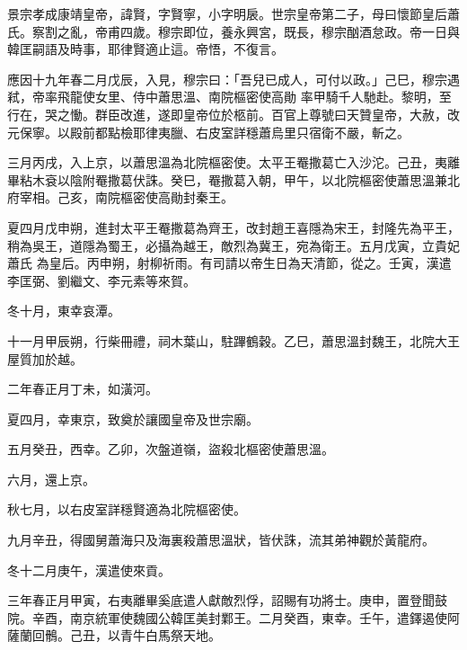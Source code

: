 
\begin{pinyinscope}

 景宗孝成康靖皇帝，諱賢，字賢寧，小字明扆。世宗皇帝第二子，母曰懷節皇后蕭氏。察割之亂，帝甫四歲。穆宗即位，養永興宮，既長，穆宗酗酒怠政。帝一日與韓匡嗣語及時事，耶律賢適止這。帝悟，不復言。



 應因十九年春二月戊辰，入見，穆宗曰：「吾兒已成人，可付以政。」己巳，穆宗遇弒，帝率飛龍使女里、侍中蕭思溫、南院樞密使高勛
 率甲騎千人馳赴。黎明，至行在，哭之慟。群臣改進，遂即皇帝位於柩前。百官上尊號曰天贊皇帝，大赦，改元保寧。以殿前都點檢耶律夷臘、右皮室詳穩蕭烏里只宿衛不嚴，斬之。



 三月丙戌，入上京，以蕭思溫為北院樞密使。太平王罨撒葛亡入沙沱。己丑，夷離畢粘木袞以陰附罨撒葛伏誅。癸巳，罨撒葛入朝，甲午，以北院樞密使蕭思溫兼北府宰相。己亥，南院樞密使高勛封秦王。



 夏四月戊申朔，進封太平王罨撒葛為齊王，改封趙王喜隱為宋王，封隆先為平王，稍為吳王，道隱為蜀王，必攝為越王，敵烈為冀王，宛為衛王。五月戊寅，立貴妃蕭氏
 為皇后。丙申朔，射柳祈雨。有司請以帝生日為天清節，從之。壬寅，漢遣李匡弼、劉繼文、李元素等來賀。



 冬十月，東幸哀潭。



 十一月甲辰朔，行柴冊禮，祠木葉山，駐蹕鶴穀。乙巳，蕭思溫封魏王，北院大王屋質加於越。



 二年春正月丁未，如潢河。



 夏四月，幸東京，致奠於讓國皇帝及世宗廟。



 五月癸丑，西幸。乙卯，次盤道嶺，盜殺北樞密使蕭思溫。



 六月，還上京。



 秋七月，以右皮室詳穩賢適為北院樞密使。



 九月辛丑，得國舅蕭海只及海裏殺蕭思溫狀，皆伏誅，流其弟神觀於黃龍府。



 冬十二月庚午，漢遣使來貢。



 三年春正月甲寅，右夷離畢奚底遣人獻敵烈俘，詔賜有功將士。庚申，置登聞鼓院。辛酉，南京統軍使魏國公韓匡美封鄴王。二月癸酉，東幸。壬午，遣鐸遏使阿薩蘭回鶻。己丑，以青牛白馬祭天地。




\end{pinyinscope}
